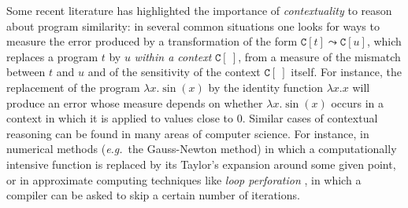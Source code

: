   

 
  
% 
%  
%
%
% 
% 
%  

Some recent literature \cite{chaudhuri, dallago:differential-stlc} has highlighted the importance of \emph{contextuality} to reason about program similarity: in several common situations one looks for ways to measure the error produced by a transformation of the form $\mathtt C[t] \leadsto \mathtt C[u]$, which replaces a program $t$ by $u$ \emph{within a context} $\mathtt C[\ ]$, from a measure of the mismatch between $t$ and $u$ and of the sensitivity of the context $\mathtt C[\ ]$ itself.
%
%
%
%
%
  For instance, the replacement of the program $\lambda x.\sin(x)$ by the identity function $\lambda x.x$
  will produce an error whose measure depends on whether
$\lambda x.\sin(x)$
occurs in a context in which it is applied to values close to $0$.
 Similar cases of contextual reasoning can be found  in many areas of computer science. For instance, 
 in numerical methods (\emph{e.g.}~the Gauss-Newton method) in which a 
 computationally intensive function is replaced by its Taylor's expansion {around some given point}, or in {approximate computing} techniques like \emph{loop perforation} \cite{loopperf}, in which a compiler can be asked to skip a certain number of iterations.%
 

% 
% 
% 
 
